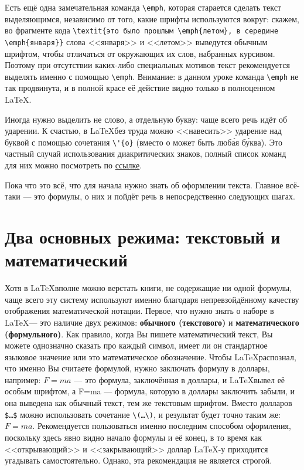 {\par Есть ещё одна замечательная команда \verb"\emph", которая старается сделать текст выделяющимся, независимо от того, какие шрифты используются вокруг: скажем, во фрагменте кода \verb"\textit{это было прошлым \emph{летом}, в середине \emph{января}}" слова <<января>> и <<летом>> выведутся обычным шрифтом, чтобы отличаться от окружающих их слов, набранных курсивом. Поэтому при отсутствии каких-либо специальных мотивов текст рекомендуется выделять именно с помощью \verb"\emph". Внимание: в данном уроке команда \verb"\emph" не так продвинута, и в полной красе её действие видно только в полноценном \LaTeX.

\par Иногда нужно выделить не слово, а отдельную букву: чаще всего речь идёт об ударении. К счастью, в \LaTeX без труда можно <<навесить>> ударение над буквой с помощью сочетания \verb"\'{о}" (вместо о может быть люб\'{а}я б\'{у}ква). Это частный случай использования диакритических знаков, полный список команд для них можно посмотреть по \href{https://en.wikibooks.org/wiki/LaTeX/Special_Characters#Escaped_codes}{ссылке}.

\par Пока что это всё, что для начала нужно знать об оформлении текста. Главное всё-таки --- это формулы, о них и пойдёт речь в непосредственно следующих шагах.


\section{Два основных режима: текстовый и математический}
\par Хотя в \LaTeX вполне можно верстать книги, не содержащие ни одной формулы, чаще всего эту систему используют именно благодаря непревзойдённому качеству отображения математической нотации. Первое, что нужно знать о наборе в \LaTeX --- это наличие двух режимов: \textbf{обычного (текстового)} и \textbf{математического (формульного)}. Как правило, когда Вы пишете математический текст, Вы можете однозначно сказать про каждый символ, имеет ли он стандартное языковое значение или это математическое обозначение. Чтобы \LaTeX распознал, что именно Вы считаете формулой, нужно заключать формулу в доллары, например: $F=ma$ --- это формула, заключённая в доллары, и \LaTeX вывел её особым шрифтом, а F=ma --- формула, которую в доллары заключить забыли, и она выведена как обычный текст, тем же текстовым шрифтом. Вместо долларов \verb"$…$" можно использовать сочетание \verb"\(…\)", и результат будет точно таким же: \(F=ma.\) Рекомендуется пользоваться именно последним способом оформления, поскольку здесь явно видно начало формулы и её конец, в то время как <<открывающий>> и <<закрывающий>> доллар \LaTeX-у приходится угадывать самостоятельно. Однако, эта рекомендация не является строгой.


}
